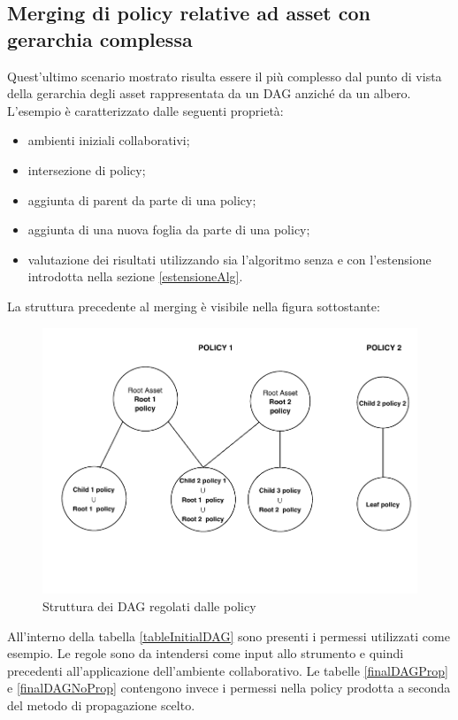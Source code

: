 \documentclass[12pt,a4paper,twoside]{book}
\begin{document}
\subsection{Merging di policy relative ad asset con gerarchia complessa}
Quest'ultimo scenario mostrato risulta essere il più complesso dal punto di vista della gerarchia degli asset rappresentata da un DAG anziché da un albero. L'esempio è caratterizzato dalle seguenti proprietà:
\begin{itemize}
\item ambienti iniziali collaborativi;
\item intersezione di policy;
\item aggiunta di parent da parte di una policy;
\item aggiunta di una nuova foglia da parte di una policy;
\item valutazione dei risultati utilizzando sia l'algoritmo senza e con l'estensione introdotta nella sezione \ref{estensioneAlg}.
\end{itemize}
La struttura precedente al merging è visibile nella figura sottostante:
\begin{figure}[H]
\centering
\includegraphics[scale=.65]{../immagini/DAGExample.pdf}
\caption{Struttura dei DAG regolati dalle policy}
\label{DAGStructureExample}
\end{figure}
All'interno della tabella \ref{tableInitialDAG} sono presenti i permessi utilizzati come esempio. Le regole sono da intendersi come input allo strumento e quindi precedenti all'applicazione dell'ambiente collaborativo.  Le tabelle \ref{finalDAGProp} e \ref{finalDAGNoProp} contengono invece i permessi nella policy prodotta a seconda del metodo di propagazione scelto.
\end{document}
